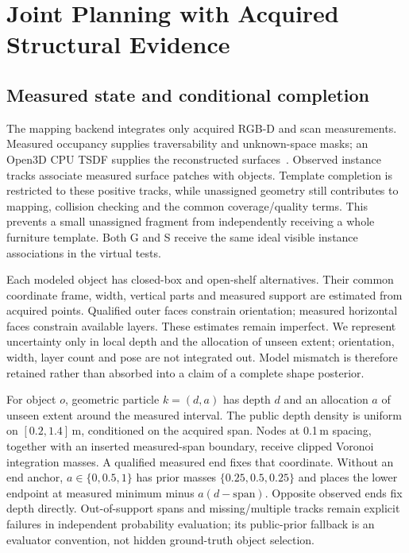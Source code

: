 \section{Joint Planning with Acquired Structural Evidence}
\label{main-method}

\subsection{Measured state and conditional completion}
The mapping backend integrates only acquired RGB-D and scan measurements. Measured occupancy supplies traversability and unknown-space masks; an Open3D CPU TSDF supplies the reconstructed surfaces~\cite{ref4,ref11}. Observed instance tracks associate measured surface patches with objects. Template completion is restricted to these positive tracks, while unassigned geometry still contributes to mapping, collision checking and the common coverage/quality terms. This prevents a small unassigned fragment from independently receiving a whole furniture template. Both G and S receive the same ideal visible instance associations in the virtual tests.

Each modeled object has closed-box and open-shelf alternatives. Their common coordinate frame, width, vertical parts and measured support are estimated from acquired points. Qualified outer faces constrain orientation; measured horizontal faces constrain available layers. These estimates remain imperfect. We represent uncertainty only in local depth and the allocation of unseen extent; orientation, width, layer count and pose are not integrated out. Model mismatch is therefore retained rather than absorbed into a claim of a complete shape posterior.

For object $o$, geometric particle $k=(d,a)$ has depth $d$ and an allocation $a$ of unseen extent around the measured interval. The public depth density is uniform on $[0.2,1.4]$\,m, conditioned on the acquired span. Nodes at 0.1\,m spacing, together with an inserted measured-span boundary, receive clipped Voronoi integration masses. A qualified measured end fixes that coordinate. Without an end anchor, $a\in\{0,0.5,1\}$ has prior masses $\{0.25,0.5,0.25\}$ and places the lower endpoint at measured minimum minus $a(d-\text{span})$. Opposite observed ends fix depth directly. Out-of-support spans and missing/multiple tracks remain explicit failures in independent probability evaluation; its public-prior fallback is an evaluator convention, not hidden ground-truth object selection.

